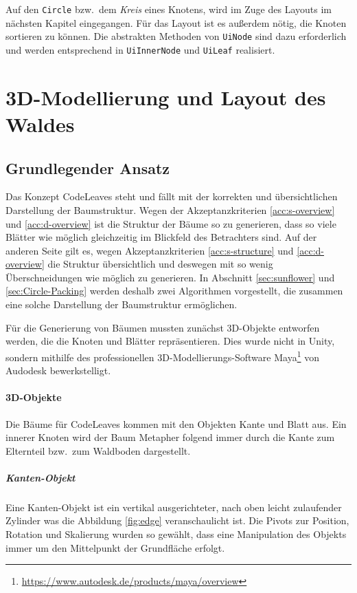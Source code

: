 Auf den \texttt{Circle} bzw.\ dem \textit{Kreis} eines Knotens, wird im Zuge des Layouts im nächsten Kapitel eingegangen. Für das Layout ist es außerdem nötig, die Knoten sortieren zu können. Die abstrakten Methoden von \texttt{UiNode} sind dazu erforderlich und werden entsprechend in \texttt{UiInnerNode} und \texttt{UiLeaf} realisiert.

\chapter{3D-Modellierung und Layout des Waldes}
\label{ch:layout}

\section{Grundlegender Ansatz}

Das Konzept CodeLeaves steht und fällt mit der korrekten und übersichtlichen Darstellung der Baumstruktur. Wegen der Akzeptanzkriterien \ref{acc:s-overview} und \ref{acc:d-overview} ist die Struktur der Bäume so zu generieren, dass so viele Blätter wie möglich gleichzeitig im Blickfeld des Betrachters sind. Auf der anderen Seite gilt es, wegen Akzeptanzkriterien \ref{acc:s-structure} und \ref{acc:d-overview} die Struktur übersichtlich und deswegen mit so wenig Überschneidungen wie möglich zu generieren. In Abschnitt \ref{sec:sunflower} und \ref{sec:Circle-Packing} werden deshalb zwei Algorithmen vorgestellt, die zusammen eine solche Darstellung der Baumstruktur ermöglichen.

Für die Generierung von Bäumen mussten zunächst 3D-Objekte entworfen werden, die die Knoten und Blätter repräsentieren. Dies wurde nicht in Unity, sondern mithilfe des professionellen 3D-Modellierungs-Software Maya\footnote{\url{https://www.autodesk.de/products/maya/overview}} von Audodesk bewerkstelligt.

\subsubsection*{3D-Objekte}

Die Bäume für CodeLeaves kommen mit den Objekten Kante und Blatt aus. Ein innerer Knoten wird der Baum Metapher folgend immer durch die Kante zum Elternteil bzw.\ zum Waldboden dargestellt.

\paragraph{Kanten-Objekt} Eine Kanten-Objekt ist ein vertikal ausgerichteter, nach oben leicht zulaufender Zylinder was die Abbildung \ref{fig:edge} veranschaulicht ist. Die Pivots zur Position, Rotation und Skalierung wurden so gewählt, dass eine Manipulation des Objekts immer um den Mittelpunkt der Grundfläche erfolgt.\\

